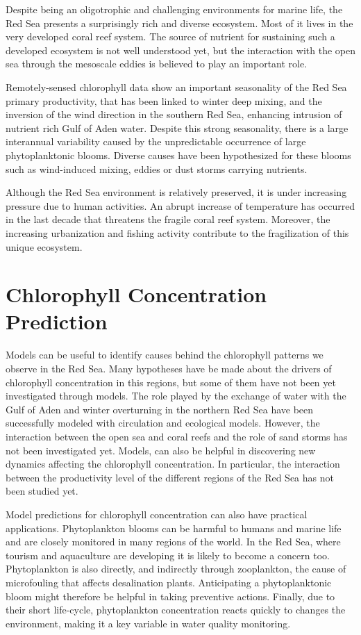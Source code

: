 Despite being an oligotrophic and challenging environments for marine life, the Red Sea presents a surprisingly rich and diverse ecosystem. Most of it lives in the very developed coral reef system. The source of nutrient for sustaining such a developed ecosystem is not well understood yet, but the interaction with the open sea through the mesoscale eddies is believed to play an important role. 

Remotely-sensed chlorophyll data show an important seasonality of the Red Sea primary productivity, that has been linked to winter deep mixing, and the inversion of the wind direction in the southern Red Sea, enhancing intrusion of nutrient rich Gulf of Aden water. Despite this strong seasonality, there is a large interannual variability caused by the unpredictable occurrence of large phytoplanktonic blooms. Diverse causes have been hypothesized for these blooms such as wind-induced mixing, eddies or dust storms carrying nutrients. 

Although the Red Sea environment is relatively preserved, it is under increasing pressure due to human activities. An abrupt increase of temperature has occurred in the last decade that threatens the fragile coral reef system. Moreover, the increasing urbanization and fishing activity contribute to the fragilization of this unique ecosystem.

\section{Chlorophyll Concentration Prediction}

Models can be useful to identify causes behind the chlorophyll patterns we observe in the Red Sea. Many hypotheses have be made about the drivers of chlorophyll concentration in this regions, but some of them have not been yet investigated through models. The role played by the exchange of water with the Gulf of Aden and winter overturning in the northern Red Sea have been successfully modeled with circulation and ecological models. However, the interaction between the open sea and coral reefs and the role of sand storms has not been investigated yet. Models, can also be helpful in discovering new dynamics affecting the chlorophyll concentration. In particular, the interaction between the productivity level of the different regions of the Red Sea has not been studied yet.  

Model predictions for chlorophyll concentration can also have practical applications. Phytoplankton blooms can be harmful to humans and marine life and are closely monitored in many regions of the world. In the Red Sea, where tourism and aquaculture are developing it is likely to become a concern too. Phytoplankton is also directly, and indirectly through zooplankton, the cause of microfouling that affects desalination plants. Anticipating a phytoplanktonic bloom might therefore be helpful in taking preventive actions. Finally, due to their short life-cycle, phytoplankton concentration reacts quickly to changes the environment, making it a  key variable in water quality monitoring.


